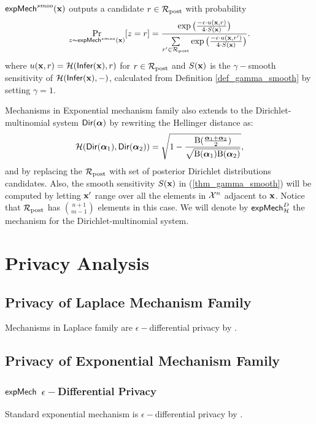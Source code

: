 \documentclass{article}
\begin{document}
 
\begin{definition}
\label{def_smoo_2}
$\mathsf{expMech}^{smoo}(\textbf{x})$ outputs a candidate $r \in \mathcal{R}_{\textup{post}}$ with probability
\begin{equation*}
  \underset{z \thicksim \mathsf{expMech}^{smoo}(\textbf{x})}{\Pr}[z = r] = \frac {\exp\big(\frac{-\epsilon\cdot u(\textbf{x}, {r})}{4\cdot S(\textbf{x})}\big)}
{\sum\limits_{r'\in \mathcal{R}_{\textup{post}}} \exp \big(\frac{-\epsilon\cdot u(\textbf{x}, r')}{4 \cdot S(\textbf{x})}\big)}.
\end{equation*}
where $u(\textbf{x}, {r}) = \mathcal{H}(\mathsf{Infer}(\textbf{x}),r)$ for $r \in \mathcal{R}_{\textup{post}}$ and $S(\textbf{x})$ is the $\gamma -$smooth sensitivity of $\mathcal{H}(\mathsf{Infer}(\textbf{x}),-)$, calculated from Definition \ref{def_gamma_smooth} by setting $\gamma = 1$.
\end{definition}
Mechanisms in Exponential mechanism family also extends to the Dirichlet-multinomial system $\mathsf{Dir}(\boldsymbol{\alpha})$ by rewriting the Hellinger distance as:
\[
  \mathcal{H}(\mathsf{Dir}(\boldsymbol{\alpha}_1), \mathsf{Dir}(\boldsymbol{\alpha}_2)) = \sqrt{1 - \frac{\textup{B}(\frac{\boldsymbol{\alpha}_1 + \boldsymbol{\alpha}_2}{2})}{\sqrt{\textup{B}(\boldsymbol{\alpha}_1) \textup{B}(\boldsymbol{\alpha}_2)}}},
\]
and by replacing the $\mathcal{R}_{\textup{post}}$ with set of posterior Dirichlet
distributions candidates. Also, the smooth sensitivity $S(\textbf{x})$
in (\ref{thm_gamma_smooth}) will be computed by letting $\textbf{x}'$ range
over all the elements in $\mathcal{X}^{n}$ adjacent to $\textbf{x}$. Notice
that $\mathcal{R}_{\textup{post}}$ has $\binom{n + 1}{m - 1}$ elements in this case. We
will denote by $\mathsf{expMech}^{D}_{\mathcal{H}}$ the mechanism for the
Dirichlet-multinomial system.


\section{Privacy Analysis}

\subsection{Privacy of Laplace Mechanism Family}
Mechanisms in Laplace family are $\epsilon-$differential privacy by \cite{dwork2014algorithmic}.

\subsection{Privacy of Exponential Mechanism Family}
\subsubsection{$\mathsf{expMech}$ $\epsilon-$Differential Privacy}
Standard exponential mechanism is $\epsilon-$differential privacy by \cite{dwork2014algorithmic}.
\end{document}
